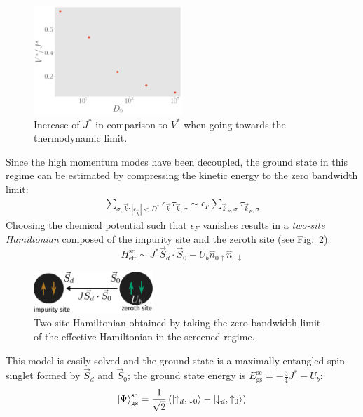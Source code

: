 \documentclass[reprint,superscriptaddress,floatfix]{revtex4-2}
\begin{document}
\begin{figure}[!htb]
	\centering
	\includegraphics[width=0.5\textwidth]{../figures/J_bandwidth.pdf}
	\caption{Increase of \(J^*\) in comparison to \(V^*\) when going towards the thermodynamic limit.}
	\label{J_bandwidth}
\end{figure}

Since the high momentum modes have been decoupled, the ground state in this regime can be estimated by compressing the kinetic energy to the zero bandwidth limit: 
\begin{equation}\begin{aligned}
	\sum_{\sigma,\vec k:|\epsilon_{\vec k}| < D^*} \epsilon_{\vec k} \tau_{\vec k,\sigma} \sim \epsilon_F \sum_{\vec k_F,\sigma}\tau_{\vec k_F,\sigma}
\end{aligned}\end{equation}
Choosing the chemical potential such that \(\epsilon_F\) vanishes results in a {\it two-site Hamiltonian} composed of the impurity site and the zeroth site (see Fig.~\ref{zero-bw}):
\begin{equation}
	\label{two-site}
	H_\text{eff}^\text{sc} \sim J^* \vec{S}_d\cdot\vec{S}_0 - U_b \hat n_{0 \uparrow} \hat n_{0 \downarrow}
\end{equation}
\begin{figure}[htpb]
	\centering
	\includegraphics[width=0.4\textwidth]{../figures/zeromode_eff.pdf}
	\caption{Two site Hamiltonian obtained by taking the zero bandwidth limit of the effective Hamiltonian in the screened regime.}
	\label{zero-bw}
\end{figure}
This model is easily solved and the ground state is a maximally-entangled spin singlet formed by \(\vec S_d\) and \(\vec S_0\); the ground state energy is \(E_\text{gs}^\text{sc} = -\frac{3}{4}J^* - U_b\):
\begin{equation}\begin{aligned}
	\ket{\Psi}_\text{gs}^\text{sc} = \frac{1}{\sqrt 2}\left(\ket{\uparrow_d,\downarrow_0} - \ket{\downarrow_d,\uparrow_0}\right)
\end{aligned}\end{equation}
\end{document}
